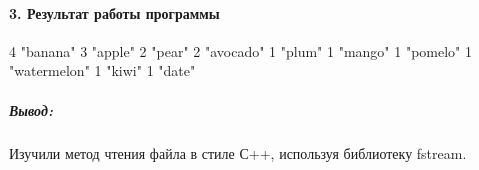 \newpage

\paragraph{3. Результат работы программы}\hspace{0pt}


    \begin{MyVerbatimCode}[
        label=Console out,
        fontsize=\small,
    ]
4	"banana"
3	"apple"
2	"pear"
2	"avocado"
1	"plum"
1	"mango"
1	"pomelo"
1	"watermelon"
1	"kiwi"
1	"date"
\end{MyVerbatimCode}

\subparagraph{Вывод:} Изучили метод чтения файла в стиле С++, используя библиотеку fstream.
